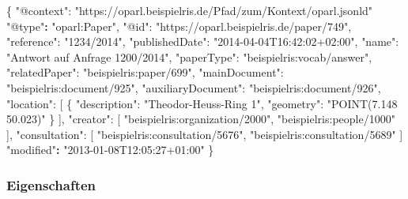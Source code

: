 \documentclass[,a4paper]{article}
\newenvironment{Shaded}{}{}
\newcommand{\DataTypeTok}[1]{\textcolor[rgb]{0.56,0.13,0.00}{{#1}}}
\newcommand{\StringTok}[1]{\textcolor[rgb]{0.25,0.44,0.63}{{#1}}}
\newcommand{\ErrorTok}[1]{\textcolor[rgb]{1.00,0.00,0.00}{\textbf{{#1}}}}
\newcommand{\NormalTok}[1]{{#1}}
\begin{document}
\begin{Shaded}
\begin{Highlighting}[]
\NormalTok{\{}
    \DataTypeTok{"@context"}\NormalTok{: }\StringTok{"https://oparl.beispielris.de/Pfad/zum/Kontext/oparl.jsonld"}
    \StringTok{"@type"}\ErrorTok{:} \StringTok{"oparl:Paper"}\NormalTok{,}
    \DataTypeTok{"@id"}\NormalTok{: }\StringTok{"https://oparl.beispielris.de/paper/749"}\NormalTok{,}
    \DataTypeTok{"reference"}\NormalTok{: }\StringTok{"1234/2014"}\NormalTok{,}
    \DataTypeTok{"publishedDate"}\NormalTok{: }\StringTok{"2014-04-04T16:42:02+02:00"}\NormalTok{,}
    \DataTypeTok{"name"}\NormalTok{: }\StringTok{"Antwort auf Anfrage 1200/2014"}\NormalTok{,}
    \DataTypeTok{"paperType"}\NormalTok{: }\StringTok{"beispielris:vocab/answer"}\NormalTok{,}
    \DataTypeTok{"relatedPaper"}\NormalTok{: }\StringTok{"beispielris:paper/699"}\NormalTok{,}
    \DataTypeTok{"mainDocument"}\NormalTok{: }\StringTok{"beispielris:document/925"}\NormalTok{,}
    \DataTypeTok{"auxiliaryDocument"}\NormalTok{: }\StringTok{"beispielris:document/926"}\NormalTok{,}
    \DataTypeTok{"location"}\NormalTok{: [}
        \NormalTok{\{}
            \DataTypeTok{"description"}\NormalTok{: }\StringTok{"Theodor-Heuss-Ring 1"}\NormalTok{,}
            \DataTypeTok{"geometry"}\NormalTok{: }\StringTok{"POINT(7.148  50.023)"}
        \NormalTok{\}}
    \NormalTok{],}
    \DataTypeTok{"creator"}\NormalTok{: [}
        \StringTok{"beispielris:organization/2000"}\NormalTok{,}
        \StringTok{"beispielris:people/1000"}
    \NormalTok{],}
    \DataTypeTok{"consultation"}\NormalTok{: [}
        \StringTok{"beispielris:consultation/5676"}\NormalTok{,}
        \StringTok{"beispielris:consultation/5689"}
    \NormalTok{]}
    \StringTok{"modified"}\ErrorTok{:} \StringTok{"2013-01-08T12:05:27+01:00"}
\NormalTok{\}}
\end{Highlighting}
\end{Shaded}

\subsubsection{Eigenschaften}\label{eigenschaften-6}
\end{document}
